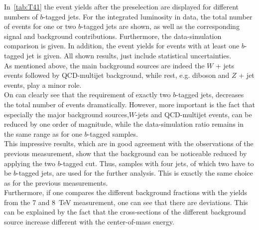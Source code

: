 \noindent In~\cref{tab:T41} the event yields after the preselection are displayed for different numbers of $b$-tagged jets. For the integrated luminosity in data, the total number of events for one or two $b$-tagged jets are shown, as well as the corresponding signal and background contributions. Furthermore, the data-simulation comparison is given. In addition, the event yields for events with at least one $b$-tagged jet is given. All shown results, just include statistical uncertainties.\\

\noindent As mentioned above, the main background sources are indeed the $W$ + jets events followed by QCD-multijet background, while rest, e.g. diboson  and $Z$ + jet events, play a minor role. \\
\noindent On can clearly see that the requirement of exactly two $b$-tagged jets, decreases the total number of events dramatically. However, more important is the fact that especially the major background sources,$W$-jets and QCD-multijet events, can be reduced by one order of magnitude, while the data-simulation ratio remains in the same range as for one $b$-tagged samples.\\
\noindent This impressive results, which are in good agreement with the observations of the previous measurement, show that the background can be noticeable reduced by applying the two $b$-tagged cut. Thus, samples with four jets, of which two have to be $b$-tagged jets, are used for the further analysis. This is exactly the same choice as for the previous measurements.\\
\noindent Furthermore, if one compares the different background fractions with the yields from the 7 and 8~TeV measurement, one can see that there are deviations. This can be explained by the fact that the cross-sections of the different background source  increase different with the center-of-mass energy.\\ 